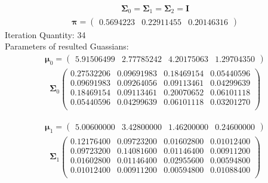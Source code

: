 \documentclass[11pt,a4paper]{article}
\newcommand{\htab}{\hspace*{0.63cm}}
\newcommand{\bs}[1]{\boldsymbol{#1}}
\begin{document}
        \begin{align} 
            \bs{\Sigma}_{0} = \bs{\Sigma}_{1} = \bs{\Sigma}_{2} = \bs{I}
        \end{align} \vspace{-1cm}
        \begin{align}  \bs{\pi} = \begin{pmatrix}
            0.5694223 & 0.22911455 & 0.20146316
        \end{pmatrix} \end{align}
        \htab Iteration Quantity: 34 \\
        \htab Parameters of resulted Guassians:
        \begin{align} \bs{\mu}_{0} = \begin{pmatrix} 
            5.91506499 & 2.77785242 & 4.20175063 & 1.29704350 
        \end{pmatrix}  \end{align}\vspace{-1cm} 
        \begin{align} \bs{\Sigma}_{0}\begin{pmatrix} 
            0.27532206 & 0.09691983 & 0.18469154 & 0.05440596 \\ 
            0.09691983 & 0.09264056 & 0.09113461 & 0.04299639 \\ 
            0.18469154 & 0.09113461 & 0.20070652 & 0.06101118 \\ 
            0.05440596 & 0.04299639 & 0.06101118 & 0.03201270 \\ 
        \end{pmatrix} \end{align}

        \begin{align} \bs{\mu}_{1} = \begin{pmatrix} 
            5.00600000 & 3.42800000 & 1.46200000 & 0.24600000 
        \end{pmatrix}  \end{align}\vspace{-1cm} 
        \begin{align} \bs{\Sigma}_{1}\begin{pmatrix} 
            0.12176400 & 0.09723200 & 0.01602800 & 0.01012400 \\ 
            0.09723200 & 0.14081600 & 0.01146400 & 0.00911200 \\ 
            0.01602800 & 0.01146400 & 0.02955600 & 0.00594800 \\ 
            0.01012400 & 0.00911200 & 0.00594800 & 0.01088400 \\ 
        \end{pmatrix} \end{align}
\end{document}
